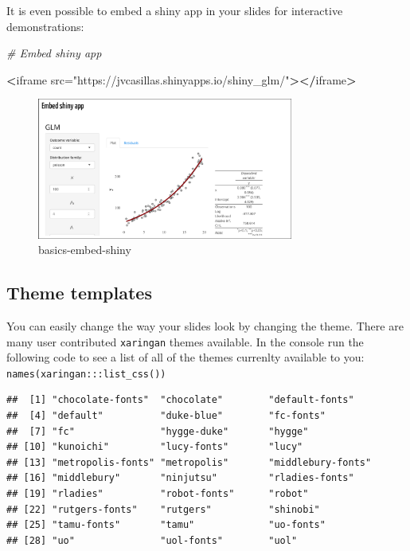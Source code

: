 \documentclass[
]{book}
\newenvironment{Shaded}{\begin{snugshade}}{\end{snugshade}}
\newcommand{\CommentTok}[1]{\textcolor[rgb]{0.37,0.37,0.37}{\textit{#1}}}
\newcommand{\ErrorTok}[1]{\textcolor[rgb]{0.14,0.14,0.14}{\textbf{#1}}}
\newcommand{\NormalTok}[1]{#1}
\newcommand{\OperatorTok}[1]{\textcolor[rgb]{0.43,0.43,0.43}{\textbf{#1}}}
\newcommand{\StringTok}[1]{\textcolor[rgb]{0.5,0.5,0.5}{#1}}
\begin{document}
It is even possible to embed a shiny app in your slides for interactive demonstrations:

\begin{Shaded}
\begin{Highlighting}[]
\CommentTok{# Embed shiny app}

\OperatorTok{<}\NormalTok{iframe src=}\StringTok{"https://jvcasillas.shinyapps.io/shiny_glm/"}\OperatorTok{>}\ErrorTok{</}\NormalTok{iframe}\OperatorTok{>}
\end{Highlighting}
\end{Shaded}

\begin{figure}
\centering
\includegraphics[width=0.75\textwidth,height=\textheight]{img/02_basics-embed-shiny.png}
\caption{basics-embed-shiny}
\end{figure}

\hypertarget{theme-templates}{%
\subsection{Theme templates}\label{theme-templates}}

You can easily change the way your slides look by changing the theme. There are many user contributed \texttt{xaringan} themes available. In the console run the following code to see a list of all of the themes currenlty available to you: \texttt{names(xaringan:::list\_css())}

\begin{verbatim}
##  [1] "chocolate-fonts"  "chocolate"        "default-fonts"   
##  [4] "default"          "duke-blue"        "fc-fonts"        
##  [7] "fc"               "hygge-duke"       "hygge"           
## [10] "kunoichi"         "lucy-fonts"       "lucy"            
## [13] "metropolis-fonts" "metropolis"       "middlebury-fonts"
## [16] "middlebury"       "ninjutsu"         "rladies-fonts"   
## [19] "rladies"          "robot-fonts"      "robot"           
## [22] "rutgers-fonts"    "rutgers"          "shinobi"         
## [25] "tamu-fonts"       "tamu"             "uo-fonts"        
## [28] "uo"               "uol-fonts"        "uol"
\end{verbatim}
\end{document}
